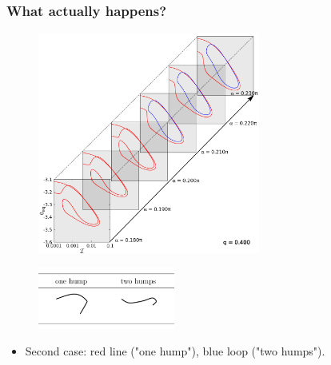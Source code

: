 \documentclass{beamer}
\newcommand{\bi}{\begin{itemize}}
\newcommand{\ei}{\end{itemize}}
\begin{document}
\begin{frame}
	\frametitle{What actually happens?}
	\begin{overlayarea}{\textwidth}{\textheight}\vspace{-0.5cm}
		\begin{figure}[htb]
		\begin{center}
			\includegraphics[width=0.65\textwidth]{plots/elastic_beam_I_theta_q_0.400_alpha_6.png}
		\end{center}
	\end{figure}\vspace{-7.5cm}
    \begin{figure}[htb]
    	    \raggedright
    		\includegraphics[width=0.4\textwidth]{plots/two_deformations.png}
    \end{figure}\vspace{4.6cm}
\bi
\item Second case: red line ("one hump"), blue loop ("two humps"). 
\ei
\end{overlayarea}
\end{frame}

\end{document}
